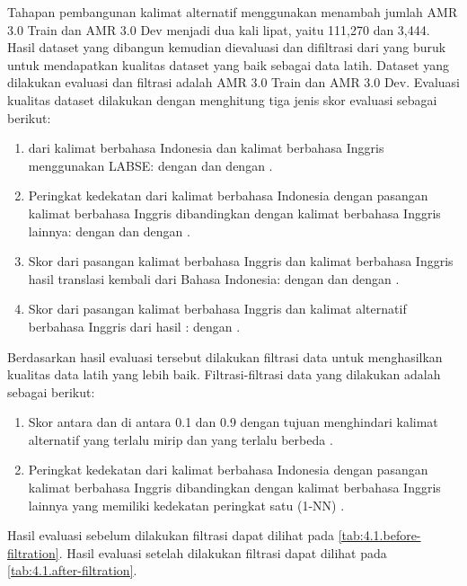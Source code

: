 Tahapan pembangunan kalimat alternatif menggunakan \AMRtoTEXT{} menambah jumlah AMR 3.0 Train dan AMR 3.0 Dev menjadi dua kali lipat, yaitu 111,270 dan 3,444.
Hasil dataset yang dibangun kemudian dievaluasi dan difiltrasi dari yang buruk untuk mendapatkan kualitas dataset yang baik sebagai data latih.
Dataset yang dilakukan evaluasi dan filtrasi adalah AMR 3.0 Train dan AMR 3.0 Dev.
Evaluasi kualitas dataset dilakukan dengan menghitung tiga jenis skor evaluasi sebagai berikut:

\begin{enumerate}
  \item \Cossim{} dari  kalimat berbahasa Indonesia dan kalimat berbahasa Inggris menggunakan \gls{LABSE}:  dengan  dan  dengan .
  \item Peringkat  kedekatan  dari kalimat berbahasa Indonesia dengan pasangan kalimat berbahasa Inggris dibandingkan dengan kalimat berbahasa Inggris lainnya:  dengan  dan  dengan .
  \item Skor \BLEU{} dari pasangan kalimat berbahasa Inggris dan kalimat berbahasa Inggris hasil translasi kembali dari Bahasa Indonesia:  dengan  dan  dengan .
  \item Skor \BLEU{} dari pasangan kalimat berbahasa Inggris dan kalimat alternatif berbahasa Inggris dari hasil \AMRtoTEXT{}:  dengan .
\end{enumerate}

Berdasarkan hasil evaluasi tersebut dilakukan filtrasi data untuk menghasilkan kualitas data latih yang lebih baik.
Filtrasi-filtrasi data yang dilakukan adalah sebagai berikut:

\begin{enumerate}
  \item Skor \BLEU{} antara  dan  di antara 0.1 dan 0.9 dengan tujuan menghindari kalimat alternatif yang terlalu mirip dan yang terlalu berbeda .
  \item Peringkat  kedekatan  dari kalimat berbahasa Indonesia dengan pasangan kalimat berbahasa Inggris dibandingkan dengan kalimat berbahasa Inggris lainnya yang memiliki kedekatan peringkat satu (\gls{1-NN}) .
\end{enumerate}

Hasil evaluasi sebelum dilakukan filtrasi dapat dilihat pada \cref{tab:4.1.before-filtration}.
Hasil evaluasi setelah dilakukan filtrasi dapat dilihat pada \cref{tab:4.1.after-filtration}.

